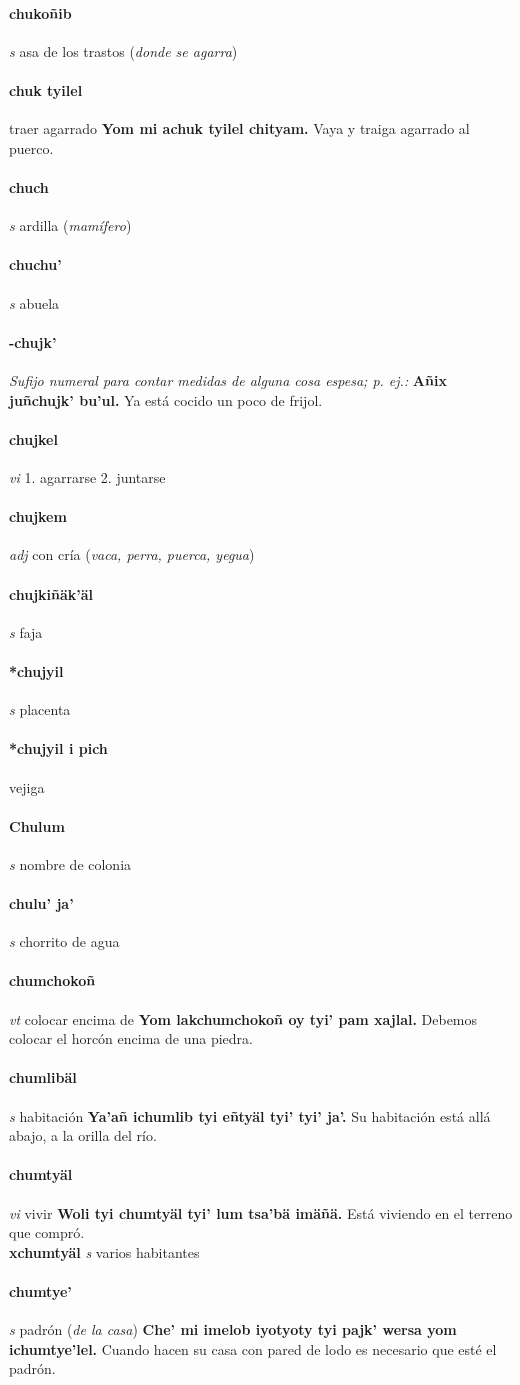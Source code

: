 \documentclass{scrbook}
\newcommand{\entry}[1]{\paragraph{#1}}
\newcommand{\onedefinition}[1]{#1.}
\newcommand{\nontranslationdef}[1]{\textit{#1}}
\newcommand{\partofspeech}[1]{\textit{#1}}
\newcommand{\spanishtranslation}[1]{#1}
\newcommand{\clarification}[1]{(\textit{#1})}
\newcommand{\cholexample}[1]{\textbf{#1}}
\newcommand{\exampletranslation}[1]{#1}
\newcommand{\secondaryentry}[1]{\\\textbf{#1}}
\newcommand{\secondpartofspeech}[1]{\textit{#1}}
\newcommand{\secondtranslation}[1]{#1}
\begin{document}
\begin{multicols}{2}
\entry{chukoñib}
\partofspeech{s}
\spanishtranslation{asa de los trastos}
\clarification{donde se agarra}

\entry{chuk tyilel}
\spanishtranslation{traer agarrado}
\cholexample{Yom mi achuk tyilel chityam.}
\exampletranslation{Vaya y traiga agarrado al puerco.}

\entry{chuch}
\partofspeech{s}
\spanishtranslation{ardilla}
\clarification{mamífero}

\entry{chuchu'}
\partofspeech{s}
\spanishtranslation{abuela}

\entry{-chujk'}
\nontranslationdef{Sufijo numeral para contar medidas de alguna cosa espesa; p. ej.:}
\cholexample{Añix juñchujk' bu'ul.}
\exampletranslation{Ya está cocido un poco de frijol.}

\entry{chujkel}
\partofspeech{vi}
\onedefinition{1}
\spanishtranslation{agarrarse}
\onedefinition{2}
\spanishtranslation{juntarse}

\entry{chujkem}
\partofspeech{adj}
\spanishtranslation{con cría}
\clarification{vaca, perra, puerca, yegua}

\entry{chujkiñäk'äl}
\partofspeech{s}
\spanishtranslation{faja}

\entry{*chujyil}
\partofspeech{s}
\spanishtranslation{placenta}

\entry{*chujyil i pich}
\spanishtranslation{vejiga}

\entry{Chulum}
\partofspeech{s}
\spanishtranslation{nombre de colonia}

\entry{chulu' ja'}
\partofspeech{s}
\spanishtranslation{chorrito de agua}

\entry{chumchokoñ}
\partofspeech{vt}
\spanishtranslation{colocar encima de}
\cholexample{Yom lakchumchokoñ oy tyi' pam xajlal.}
\exampletranslation{Debemos colocar el horcón encima de una piedra.}

\entry{chumlibäl}
\partofspeech{s}
\spanishtranslation{habitación}
\cholexample{Ya'añ ichumlib tyi eñtyäl tyi' tyi' ja'.}
\exampletranslation{Su habitación está allá abajo, a la orilla del río.}

\entry{chumtyäl}
\partofspeech{vi}
\spanishtranslation{vivir}
\cholexample{Woli tyi chumtyäl tyi' lum tsa'bä imäñä.}
\exampletranslation{Está viviendo en el terreno que compró.}
\secondaryentry{xchumtyäl}
\secondpartofspeech{s}
\secondtranslation{varios habitantes}

\entry{chumtye'}
\partofspeech{s}
\spanishtranslation{padrón}
\clarification{de la casa}
\cholexample{Che' mi imelob iyotyoty tyi pajk' wersa yom ichumtye'lel.}
\exampletranslation{Cuando hacen su casa con pared de lodo es necesario que esté el padrón.}


\end{multicols}
\end{document}
